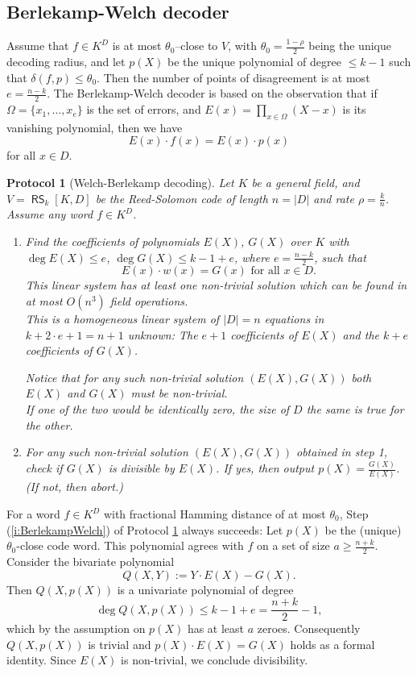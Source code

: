 \documentclass[11pt]{article}
\newtheorem{protocol}[]{Protocol}
\theoremstyle{definition}
\theoremstyle{remark}
\DeclareMathOperator{\RS}{\mathsf{RS}}
\begin{document}
\subsection{Berlekamp-Welch decoder}

Assume that  $f\in K^D$ is at most $\theta_0$--close to $V$, with
$\theta_0 = \frac{1-\rho}{2}$ being the unique decoding radius, 
and let $p(X)$ be the unique polynomial of degree $\leq k-1$ such that $\delta(f,p) \leq \theta_0$. 
Then the number of points of disagreement is at most $e=\frac{n-k}{2}$. 
The Berlekamp-Welch decoder \cite{BerlekampWelch} is based on the observation that if $\Omega =\{x_1,\ldots,x_e\}$ is the set of errors, and $E(x)=\prod_{x\in\Omega} (X-x)$ is its vanishing polynomial, then we have 
\[
E(x)\cdot f(x) = E(x)\cdot p(x)
\]
for all $x\in D$.

\begin{protocol}[Welch-Berlekamp decoding]
\label{p:BerlekampWelch} 
Let $K$ be a general field, and $V=\RS_k[K,D]$ be the Reed-Solomon code  of length $n= |D|$ and rate $\rho = \frac{k}{n}$.  
Assume any word $f\in K^D$. 
\begin{enumerate}
\item 
Find the coefficients of polynomials $E(X)$, $G(X)$ over $K$ with $\deg E(X)\leq e$, $\deg G(X)\leq k-1+e$, where $e=\frac{n-k}{2}$, such that
\[
	E(x)\cdot w(x) = G(x) \text{ for all } x\in D.
\] 
This linear system has at least one non-trivial solution which can be found in at most $O\left(n^3\right)$ field operations.
\\
{\tiny
This is a homogeneous linear system of $|D|=n$ equations in $k+2\cdot e+1=n+1$ unknown: 
The $e+1$ coefficients of $E(X)$ and the $k+e$ coefficients of $G(X)$.
}

Notice that for any such non-trivial solution $(E(X),G(X))$ both $E(X)$ and $G(X)$ must be non-trivial. 
\\
{\tiny
If one of the two would be identically zero, the size of $D$ the same is true for the other.
}

\item
\label{i:BerlekampWelch}
For any such non-trivial solution $(E(X),G(X))$ obtained in step 1, check if $G(X)$ is divisible by $E(X)$. 
If yes, then output $p(X)= \frac{G(X)}{E(X)}$.  
(If not, then abort.)
\end{enumerate}
\end{protocol}

For a word $f\in K^D$ with fractional Hamming distance of at most $\theta_0$, Step (\ref{i:BerlekampWelch}) of Protocol \ref{p:BerlekampWelch} always succeeds: 
Let $p(X)$ be the (unique) $\theta_0$-close code word. 
This polynomial agrees with $f$ on a set of size $a\geq\frac{n+k}{2}$. 
Consider the bivariate polynomial
\[
Q(X,Y):= Y\cdot E(X)-G(X). 
\]
Then $Q(X,p(X))$ is a univariate polynomial of degree 
\[
\deg Q(X,p(X)) \leq k-1+e =\frac{n+k}{2} - 1,
\] 
which by the assumption on $p(X)$ has at least $a$ zeroes. 
Consequently $Q(X,p(X))$ is trivial and $p(X)\cdot E(X)=G(X)$ holds as a formal identity. 
Since $E(X)$ is non-trivial, we conclude divisibility. 
\end{document}
